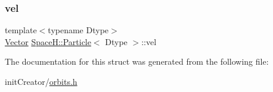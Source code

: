 \mbox{\label{struct_space_h_1_1_particle_ae90b74768294374d2b97d4e537b48673}} 
\subsubsection{\texorpdfstring{vel}{vel}}
{\footnotesize\ttfamily template$<$typename Dtype$>$ \\
\mbox{\hyperlink{struct_space_h_1_1_particle_afba20bb4c28d27263de384ba6a18f5c3}{Vector}} \mbox{\hyperlink{struct_space_h_1_1_particle}{Space\+H\+::\+Particle}}$<$ Dtype $>$\+::vel}



The documentation for this struct was generated from the following file\+:\begin{DoxyCompactItemize}
\item 
init\+Creator/\mbox{\hyperlink{orbits_8h}{orbits.\+h}}\end{DoxyCompactItemize}
